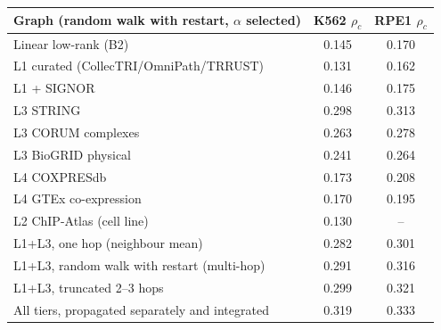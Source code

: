 \begin{tabular}{lcc}
\toprule
Graph (random walk with restart, $\alpha$ selected) & K562 $\rho_c$ & RPE1 $\rho_c$\\\midrule
Linear low-rank (B2) & 0.145 & 0.170\\
L1 curated (CollecTRI/OmniPath/TRRUST) & 0.131 & 0.162\\
L1 + SIGNOR & 0.146 & 0.175\\
L3 STRING & 0.298 & 0.313\\
L3 CORUM complexes & 0.263 & 0.278\\
L3 BioGRID physical & 0.241 & 0.264\\
L4 COXPRESdb & 0.173 & 0.208\\
L4 GTEx co-expression & 0.170 & 0.195\\
L2 ChIP-Atlas (cell line) & 0.130 & --\\
L1+L3, one hop (neighbour mean) & 0.282 & 0.301\\
L1+L3, random walk with restart (multi-hop) & 0.291 & 0.316\\
L1+L3, truncated 2--3 hops & 0.299 & 0.321\\
All tiers, propagated separately and integrated & 0.319 & 0.333\\
\bottomrule
\end{tabular}